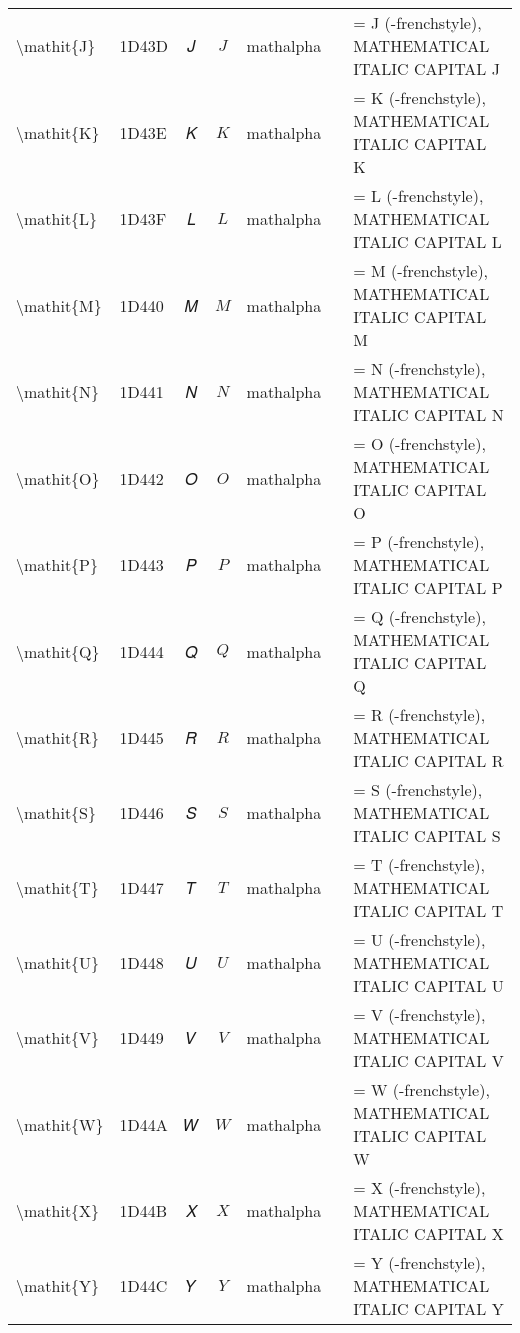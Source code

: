 \documentclass[a4paper,landscape]{article}
\begin{document}
\begin{longtable}{llcclll}
\textbackslash{}mathit\{J\} & 1D43D & 𝐽 & $\mathit{J}$ & mathalpha &  & = J (-frenchstyle),  MATHEMATICAL ITALIC CAPITAL J \\
\textbackslash{}mathit\{K\} & 1D43E & 𝐾 & $\mathit{K}$ & mathalpha &  & = K (-frenchstyle),  MATHEMATICAL ITALIC CAPITAL K \\
\textbackslash{}mathit\{L\} & 1D43F & 𝐿 & $\mathit{L}$ & mathalpha &  & = L (-frenchstyle),  MATHEMATICAL ITALIC CAPITAL L \\
\textbackslash{}mathit\{M\} & 1D440 & 𝑀 & $\mathit{M}$ & mathalpha &  & = M (-frenchstyle),  MATHEMATICAL ITALIC CAPITAL M \\
\textbackslash{}mathit\{N\} & 1D441 & 𝑁 & $\mathit{N}$ & mathalpha &  & = N (-frenchstyle),  MATHEMATICAL ITALIC CAPITAL N \\
\textbackslash{}mathit\{O\} & 1D442 & 𝑂 & $\mathit{O}$ & mathalpha &  & = O (-frenchstyle),  MATHEMATICAL ITALIC CAPITAL O \\
\textbackslash{}mathit\{P\} & 1D443 & 𝑃 & $\mathit{P}$ & mathalpha &  & = P (-frenchstyle),  MATHEMATICAL ITALIC CAPITAL P \\
\textbackslash{}mathit\{Q\} & 1D444 & 𝑄 & $\mathit{Q}$ & mathalpha &  & = Q (-frenchstyle),  MATHEMATICAL ITALIC CAPITAL Q \\
\textbackslash{}mathit\{R\} & 1D445 & 𝑅 & $\mathit{R}$ & mathalpha &  & = R (-frenchstyle),  MATHEMATICAL ITALIC CAPITAL R \\
\textbackslash{}mathit\{S\} & 1D446 & 𝑆 & $\mathit{S}$ & mathalpha &  & = S (-frenchstyle),  MATHEMATICAL ITALIC CAPITAL S \\
\textbackslash{}mathit\{T\} & 1D447 & 𝑇 & $\mathit{T}$ & mathalpha &  & = T (-frenchstyle),  MATHEMATICAL ITALIC CAPITAL T \\
\textbackslash{}mathit\{U\} & 1D448 & 𝑈 & $\mathit{U}$ & mathalpha &  & = U (-frenchstyle),  MATHEMATICAL ITALIC CAPITAL U \\
\textbackslash{}mathit\{V\} & 1D449 & 𝑉 & $\mathit{V}$ & mathalpha &  & = V (-frenchstyle),  MATHEMATICAL ITALIC CAPITAL V \\
\textbackslash{}mathit\{W\} & 1D44A & 𝑊 & $\mathit{W}$ & mathalpha &  & = W (-frenchstyle),  MATHEMATICAL ITALIC CAPITAL W \\
\textbackslash{}mathit\{X\} & 1D44B & 𝑋 & $\mathit{X}$ & mathalpha &  & = X (-frenchstyle),  MATHEMATICAL ITALIC CAPITAL X \\
\textbackslash{}mathit\{Y\} & 1D44C & 𝑌 & $\mathit{Y}$ & mathalpha &  & = Y (-frenchstyle),  MATHEMATICAL ITALIC CAPITAL Y \\

\end{longtable}
\end{document}
